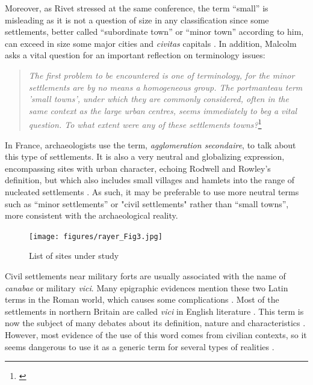 Moreover, as Rivet stressed at the same conference, the term “small” is misleading as it is not a question of size in any classification since some settlements, better called “subordinate town” or “minor town” according to him, can exceed in size some major cities and \textit{civitas} capitals \parencite[111]{Rivet_1975b}.
In addition, Malcolm \textcite[115]{Todd_1970} asks a vital question for an important reflection on terminology issues: 

\blockquote{\textit{The first problem to be encountered is one of terminology, for the minor settlements are by no means a homogeneous group. The portmanteau term 'small towns', under which they are commonly considered, often in the same context as the large urban centres, seems immediately to beg a vital question. To what extent were any of these settlements towns?}\footnote{\textcite[115]{Todd_1970}}}


In France, archaeologists use the term, \textit{agglomeration secondaire}, to talk about this type of settlements. It is also a very neutral and globalizing expression, encompassing sites with urban character, echoing Rodwell and Rowley’s definition, but which also includes small villages and hamlets into the range of nucleated settlements \parencite[18]{Mangin_1986}. As such, it may be preferable to use more neutral terms such as “minor settlements” or "civil settlements" rather than “small towns”, more consistent with the archaeological reality.

	\begin{figure}
		\texttt{[image: figures/rayer\_Fig3.jpg]}
		\caption{List of sites under study}
		\label{fig:Rayer_Fig3}
	\end{figure}

	
Civil settlements near military forts are usually associated with the name of \textit{canabae} or military \textit{vici}. Many epigraphic evidences mention these two Latin terms in the Roman world, which causes some complications \parencite[for this debate, see][]{Tarpin_2002}. Most of the settlements in northern Britain are called \textit{vici} in English literature \parencites[cf.][]{Salway_1965}{Sommer_1984}{Sommer_2006}. This term is now the subject of many debates about its definition, nature and characteristics \parencite{Tarpin_2002}. However, most evidence of the use of this word comes from civilian contexts, so it seems dangerous to use it as a generic term for several types of realities \parencites[42--43]{Favory_2012}{Tarpin_2002}.	
	
